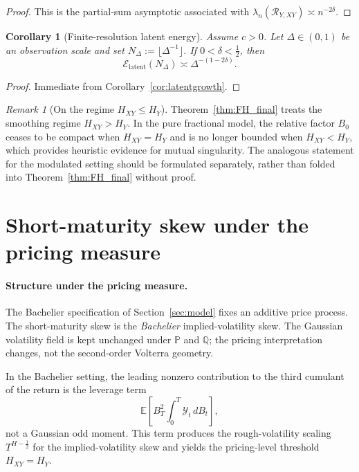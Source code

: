 \documentclass[11pt,a4paper]{amsart}
\theoremstyle{plain}
\newtheorem{corollary}[theorem]{Corollary}
\theoremstyle{definition}
\theoremstyle{remark}
\newtheorem{remark}[theorem]{Remark}
\newcommand{\Q}{\mathbb{Q}}
\newcommand{\PP}{\mathbb{P}}
\newcommand{\EE}{\mathbb{E}}
\begin{document}
\begin{proof}
This is the partial-sum asymptotic associated with
\(\lambda_n(\mathcal R_{Y,XY})\asymp n^{-2\delta}\).
\end{proof}

\begin{corollary}[Finite-resolution latent energy]\label{cor:finite_resolution}
Assume $c>0$. Let $\Delta\in(0,1)$ be an observation scale and set
$N_\Delta:=\lfloor \Delta^{-1}\rfloor$. If $0<\delta<\frac12$, then
\[
\mathcal E_{\mathrm{latent}}(N_\Delta)\asymp \Delta^{-(1-2\delta)}.
\]
\end{corollary}

\begin{proof}
Immediate from Corollary~\ref{cor:latentgrowth}.
\end{proof}

\begin{remark}[On the regime $H_{XY}\le H_Y$]\label{rem:lowregime}
Theorem~\ref{thm:FH_final} treats the smoothing regime $H_{XY}>H_Y$. In the pure fractional model, the relative factor $B_0$ ceases to be compact when $H_{XY}=H_Y$ and is no longer bounded when $H_{XY}<H_Y$, which provides heuristic evidence for mutual singularity. The analogous statement for the modulated setting should be formulated separately, rather than folded into Theorem~\ref{thm:FH_final} without proof.
\end{remark}


\section{Short-maturity skew under the pricing measure}\label{sec:Q_skew}

\paragraph{Structure under the pricing measure.}
The Bachelier specification of Section~\ref{sec:model} fixes an additive price process.  The
short-maturity skew is the \emph{Bachelier} implied-volatility skew.  The Gaussian volatility field
is kept unchanged under $\PP$ and $\Q$; the pricing interpretation changes, not the second-order
Volterra geometry.

In the Bachelier setting, the leading nonzero contribution to the third cumulant of the return is
the leverage term
\[
\EE\!\left[B_T^2 \int_0^T \mathcal Y_t\,dB_t\right],
\]
not a Gaussian odd moment.  This term produces the rough-volatility scaling $T^{H-\frac12}$ for the
implied-volatility skew and yields the pricing-level threshold $H_{XY}=H_Y$.
\end{document}
